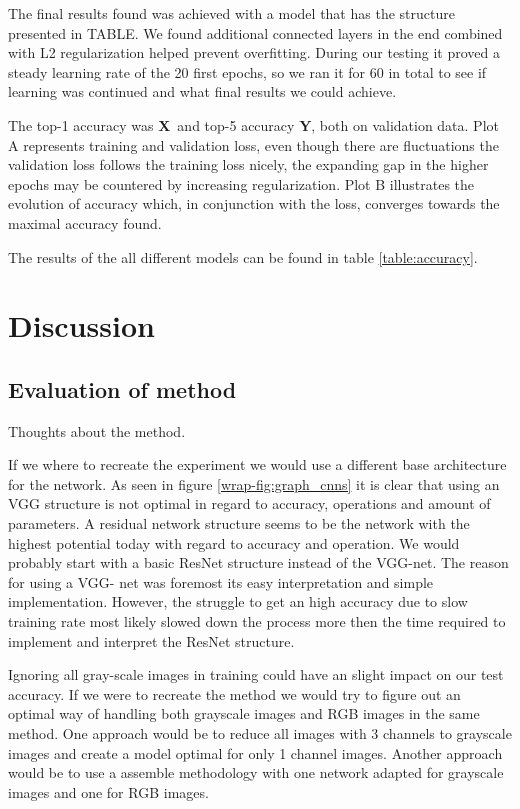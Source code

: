 \documentclass{kthreport}
\begin{document}
The final results found was achieved with a model that has the structure presented in TABLE. We found additional connected layers in the end combined with L2 regularization helped prevent overfitting. During our testing it proved a steady learning rate of the 20 first epochs, so we ran it for 60 in total to see if learning was continued and what final results we could achieve.

The top-1 accuracy was \textbf{X}\ and top-5 accuracy \textbf{Y}, both on validation data. Plot A represents training and validation loss, even though there are fluctuations the validation loss follows the training loss nicely, the expanding gap in the higher epochs may be countered by increasing regularization. Plot B illustrates the evolution of accuracy which, in conjunction with the loss, converges towards the maximal accuracy found.

The results of the all different models can be found in table \ref{table:accuracy}. 






\section{Discussion}
\label{sec:Discussion}

\subsection{Evaluation of method}
Thoughts about the method.

If we where to recreate the experiment we would use a different base architecture for the network.
As seen in figure \ref{wrap-fig:graph_cnns} it is clear that using an VGG structure is not optimal in regard to accuracy, operations and amount of parameters.
A residual network structure seems to be the network with the highest potential today with regard to accuracy and operation.
We would probably start with a basic ResNet structure instead of the VGG-net.
The reason for using a VGG- net was foremost its easy interpretation and simple implementation. However, the struggle to get an high accuracy due to slow training rate most likely slowed down the process more then the time required to implement and interpret the ResNet structure.

Ignoring all gray-scale images in training could have an slight impact on our test accuracy. If we were to recreate the method we would try to figure out an optimal way of handling both grayscale images and RGB images in the same method. One approach would be to reduce all images with 3 channels to grayscale images and create a model optimal for only 1 channel images. Another approach would be to use a assemble methodology with one network adapted for grayscale images and one for RGB images.
\end{document}
